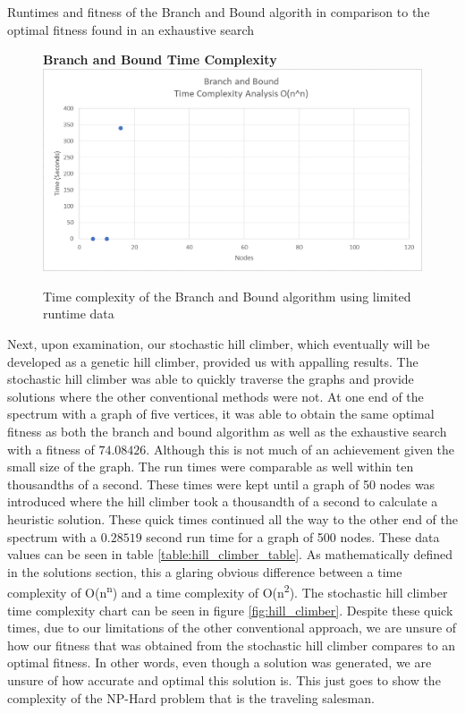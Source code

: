 \documentclass[sigplan,screen]{acmart}
\begin{document}
\begin{table}[h]
    \setlength\tabcolsep{2pt}
    \centering
    
    \caption{Runtimes and fitness of the Branch and Bound algorith in comparison to the optimal fitness found in an exhaustive search}
    \label{table:branch_and_bound_table}
\end{table}

\begin{figure}[h]
    \centering
    \textbf{Branch and Bound Time Complexity}
    \includegraphics[width=\columnwidth]{assets/branch_and_bound_time_complexity.png}
    \caption{Time complexity of the Branch and Bound algorithm using limited runtime data}
    \label{fig:branch_and_bound_time_complexity}
\end{figure}

Next, upon examination, our stochastic hill climber, which eventually will be
developed as a genetic hill climber, provided us with appalling results. The
stochastic hill climber was able to quickly traverse the graphs and provide
solutions where the other conventional methods were not. At one end of the
spectrum with a graph of five vertices, it was able to obtain the same optimal
fitness as both the branch and bound algorithm as well as the exhaustive search
with a fitness of $74.08426$. Although this is not much of an achievement given
the small size of the graph. The run times were comparable as well within ten
thousandths of a second. These times were kept until a graph of 50 nodes was
introduced where the hill climber took a thousandth of a second to calculate a
heuristic solution. These quick times continued all the way to the other end of
the spectrum with a $0.28519$ second run time for a graph of 500 nodes. These
data values can be seen in table \ref{table:hill_climber_table}. As
mathematically defined in the solutions section, this a glaring obvious
difference between a time complexity of O(n\textsuperscript{n}) and a time
complexity of O(n\textsuperscript{2}).  The stochastic hill climber time
complexity chart can be seen in figure \ref{fig:hill_climber}. Despite these
quick times, due to our limitations of the other conventional approach, we are
unsure of how our fitness that was obtained from the stochastic hill climber
compares to an optimal fitness. In other words, even though a solution was
generated, we are unsure of how accurate and optimal this solution is. This just
goes to show the complexity of the NP-Hard problem that is the traveling
salesman.
\end{document}
